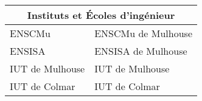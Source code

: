 
\begin{tabularx}{\linewidth}{lX}
	\toprule
	\multicolumn{2}{c}{Instituts et Écoles d’ingénieur}\\
	\midrule
	\acrshort{ENSCMu} & \acrlong{ENSCMu} de Mulhouse\\
	\acrshort{ENSISA} & \acrlong{ENSISA} de Mulhouse\\
	\acrshort{IUT} de Mulhouse & \acrlong{IUT} de Mulhouse\\
	\acrshort{IUT} de Colmar & \acrlong{IUT} de Colmar\\
	\bottomrule
\end{tabularx}

